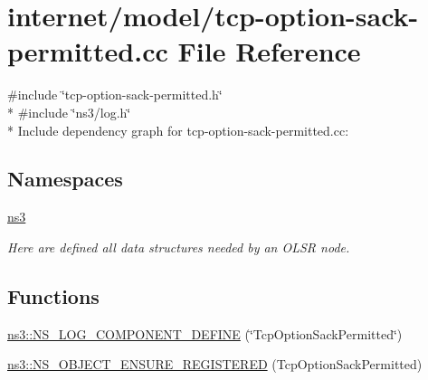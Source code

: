 \hypertarget{tcp-option-sack-permitted_8cc}{}\section{internet/model/tcp-\/option-\/sack-\/permitted.cc File Reference}
\label{tcp-option-sack-permitted_8cc}
{\ttfamily \#include \char`\"{}tcp-\/option-\/sack-\/permitted.\+h\char`\"{}}\\*
{\ttfamily \#include \char`\"{}ns3/log.\+h\char`\"{}}\\*
Include dependency graph for tcp-\/option-\/sack-\/permitted.cc\+:
\subsection*{Namespaces}
\begin{DoxyCompactItemize}
\item 
 \hyperlink{namespacens3}{ns3}
\begin{DoxyCompactList}\small\item\em Here are defined all data structures needed by an O\+L\+SR node. \end{DoxyCompactList}\end{DoxyCompactItemize}
\subsection*{Functions}
\begin{DoxyCompactItemize}
\item 
\hyperlink{namespacens3_abb06fdc9f6289de237d7856cc32012e4}{ns3\+::\+N\+S\+\_\+\+L\+O\+G\+\_\+\+C\+O\+M\+P\+O\+N\+E\+N\+T\+\_\+\+D\+E\+F\+I\+NE} (\char`\"{}Tcp\+Option\+Sack\+Permitted\char`\"{})
\item 
\hyperlink{namespacens3_a83af57ae2f27cdc25c7d89a2966c5b95}{ns3\+::\+N\+S\+\_\+\+O\+B\+J\+E\+C\+T\+\_\+\+E\+N\+S\+U\+R\+E\+\_\+\+R\+E\+G\+I\+S\+T\+E\+R\+ED} (Tcp\+Option\+Sack\+Permitted)
\end{DoxyCompactItemize}

